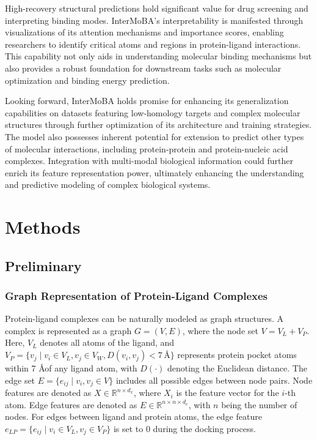 \documentclass[lettersize,journal]{IEEEtran}
\begin{document}
High-recovery structural predictions hold significant value for drug screening and interpreting binding modes. InterMoBA's interpretability is manifested through visualizations of its attention mechanisms and importance scores, enabling researchers to identify critical atoms and regions in protein-ligand interactions. This capability not only aids in understanding molecular binding mechanisms but also provides a robust foundation for downstream tasks such as molecular optimization\cite{wu2024leveraging} and binding energy prediction.

Looking forward, InterMoBA holds promise for enhancing its generalization capabilities on datasets featuring low-homology targets and complex molecular structures through further optimization of its architecture and training strategies. The model also possesses inherent potential for extension to predict other types of molecular interactions, including protein-protein and protein-nucleic acid complexes. Integration with multi-modal biological information could further enrich its feature representation power, ultimately enhancing the understanding and predictive modeling of complex biological systems.

\section{Methods}

\subsection{Preliminary}\label{AA}
\subsubsection{Graph Representation of Protein-Ligand Complexes}
Protein-ligand complexes can be naturally modeled as graph structures. A
complex is represented as a graph $G = (V,E)$, where the
node set $V = V_{L} + V_{P}$. Here, $V_{L}$ denotes all atoms
of the ligand,
and $V_{P} = \{ v_{j} \mid v_{i} \in V_{L}, v_{j} \in V_{W}, D(v_{i},v_{j}) < 7\,\text{\AA} \}$ represents protein
pocket atoms within 7 \AA of any ligand atom, with $D( \cdot )$
denoting the Euclidean distance. The edge set $E = \{ e_{ij} \mid v_{i}, v_{j} \in V\}$ includes all
possible edges between node pairs. Node features
are denoted as $X \in \mathbb{R}^{n \times d_{x}}$, where $X_{i}$ is the
feature vector for the $i$-th atom. Edge features are denoted
as $E \in \mathbb{R}^{n \times n \times d_{e}}$, with $n$ being
the number of nodes. For edges between ligand and protein atoms,
the edge
feature $e_{LP} = \{ e_{ij} \mid v_{i} \in V_{L}, v_{j} \in V_{P}\}$ is
set to 0 during the docking process.
\end{document}

